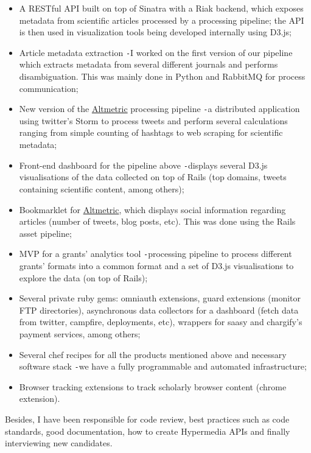 \documentclass{res}
\def\Minus{\texttt{-}}
\begin{document}
\begin{resume}
\begin{itemize}
\begin{itemize}
        \item A RESTful API built on top of Sinatra with a Riak backend, which exposes metadata from scientific articles processed by a processing pipeline; the API is then used in visualization tools being developed internally using D3.js;
        \item Article metadata extraction \Minus I worked on the first version of our pipeline which extracts metadata from several different journals and performs disambiguation. This was mainly done in Python and RabbitMQ for process communication;
        \item New version of the \href{http://altmetric.com}{Altmetric} processing pipeline \Minus a distributed application using twitter’s Storm to process tweets and perform several calculations ranging from simple counting of hashtags to web scraping for scientific metadata;
        \item Front-end dashboard for the pipeline above \Minus displays several D3.js visualisations of the data collected on top of Rails (top domains, tweets containing scientific content, among others);
        \item Bookmarklet for \href{http://www.altmetric.com/bookmarklet.php}{Altmetric}, which displays social information regarding articles (number of tweets, blog posts, etc). This was done using the Rails asset pipeline;
        \item MVP for a grants’ analytics tool \Minus processing pipeline to process different grants’ formats into a common format and a set of D3.js visualisations to explore the data (on top of Rails);
        \item Several private ruby gems: omniauth extensions, guard extensions (monitor FTP directories), asynchronous data collectors for a dashboard (fetch data from twitter, campfire, deployments, etc), wrappers for saasy and chargify’s payment services, among others;
        \item Several chef recipes for all the products mentioned above and necessary software stack \Minus we have a fully programmable and automated infrastructure;
        \item Browser tracking extensions to track scholarly browser content (chrome extension).
        \end{itemize}
      Besides, I have been responsible for code review, best practices such as code standards, good documentation, how to create Hypermedia APIs and finally interviewing new candidates.


\end{itemize}
\end{resume}
\end{document}
